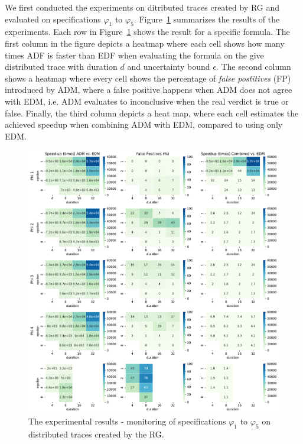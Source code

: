 We first conducted the experiments on ditributed traces created by RG and evaluated on specifications $\varphi_1$ to $\varphi_5$. Figure~\ref{fig:rgresults} summarizes the results of the experiments. Each row in Figure~\ref{fig:rgresults} shows the result for a specific formula. The first column in the figure depicts a heatmap where each cell shows how many times ADF is faster than EDF when evaluating the formula on the give distributed trace with duration $d$ and uncertainty bound $\epsilon$. The second column shows a heatmap where every cell shows the percentage of \emph{false postitives} (FP) introduced by ADM, where a false positive happens when ADM does not agree with EDM, i.e. ADM evaluates to inconclusive when the real verdict is true or false. Finally, the third column depicts a heat map, where each cell estimates the achieved speedup when combining ADM with EDM, compared to using only EDM.

\begin{figure}
	\begin{center}
	\includegraphics[width=\linewidth]{speedup}
\caption{The experimental results - monitoring of specifications $\varphi_{1}$ to $\varphi_{5}$ on distributed traces created by the RG.}
\label{fig:rgresults}
\end{center}
\end{figure}


